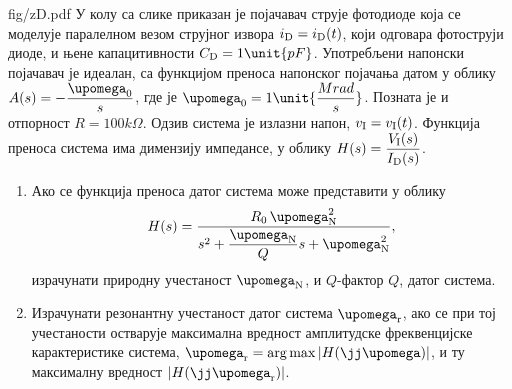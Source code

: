 \mnDifficult
\begin{slikaDesno}{fig/zD.pdf}
\PID У колу са слике приказан је појачавач струје 
фотодиоде која се моделује паралелном везом 
струјног извора $i_{\rm D} = i_{\rm D}(t)$, 
који одговара 
фотоструји диоде, и њене капацитивности 
$C_{\rm D} = 1\unit{pF}$. Употребљени напонски појачавач 
је идеалан, са функцијом преноса напонског 
појачања датом у облику 
$A(s) = -\dfrac{\upomega_{\rm 0}}{s}$, где је 
$\upomega_{\rm 0} = 1\unit{\dfrac{Mrad}{s}}$. 
Позната је и отпорност $R = 100\unit{k\Omega}$. 
Одзив 
система је излазни напон, $v_{\rm I} = v_{\rm I}(t)$.
Функција преноса система има димензију импедансе, 
у облику $H(s) = \dfrac{V_{\rm I}(s)}{I_{\rm D}(s)}$. 
\end{slikaDesno}
\begin{enumerate}[label=(\alph*)] 
    \itemsep0pt
    \item 
    Ако се функција преноса датог система може представити
    у облику
    $$H(s) = \dfrac{R_0 \, \upomega_{\rm N}^2 }{
    s^2 + \dfrac{\upomega_{\rm N}}{Q}s + \upomega_{\rm N}^2
    },$$
    израчунати природну учестаност $\upomega_{\rm N}$,
     и $Q$-фактор $Q$, датог система. 
    \item  
    Израчунати резонантну учестаност 
    датог система $\upomega_{\rm r}$, ако се при тој учестаности
    остварује максимална вредност амплитудске фреквенцијске 
    карактеристике система, $\upomega_{\rm r} = 
    \arg\max |H(\jj\upomega)|$, и ту максималну вредност
    $|H(\jj\upomega_{\rm r})|$.
\end{enumerate}

\RESENJE 

